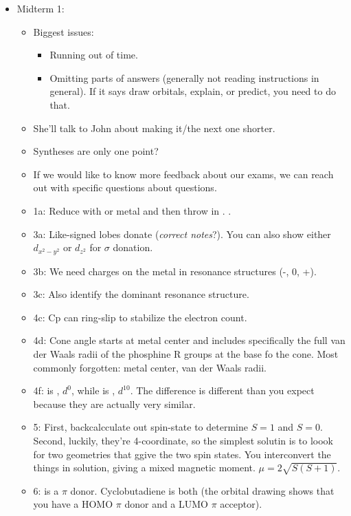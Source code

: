 \documentclass[../notes.tex]{subfiles}
\begin{document}
\begin{itemize}
    \item Midterm 1:
    \begin{itemize}
        \item Biggest issues:
        \begin{itemize}
            \item Running out of time.
            \item Omitting parts of answers (generally not reading instructions in general). If it says draw orbitals, explain, or predict, you need to do that.
        \end{itemize}
        \item She'll talk to John about making it/the next one shorter.
        \item Syntheses are only one point?
        \item If we would like to know more feedback about our exams, we can reach out with specific questions about questions.
        \item 1a: Reduce with  or  metal and then throw in . .
        \item 3a: Like-signed lobes donate (\emph{correct notes}?). You can also show either $d_{x^2-y^2}$ or $d_{z^2}$ for $\sigma$ donation.
        \item 3b: We need charges on the metal in  resonance structures (-, 0, +).
        \item 3c: Also identify the dominant resonance structure.
        \item 4c: Cp can ring-slip to stabilize the electron count.
        \item 4d: Cone angle starts at metal center and includes specifically the full van der Waals radii of the phosphine R groups at the base fo the cone. Most commonly forgotten: metal center, van der Waals radii.
        \item 4f:  is , $d^0$, while  is , $d^{10}$. The difference is different than you expect because they are actually very similar.
        \item 5: First, backcalcculate out spin-state to determine $S=1$ and $S=0$. Second, luckily, they're 4-coordinate, so the simplest solutin is to loook for two geometries that ggive the two spin states. You interconvert the things in solution, giving a mixed magnetic moment. $\mu=2\sqrt{S(S+1)}$.
        \item 6:  is a $\pi$ donor. Cyclobutadiene is both (the orbital drawing shows that you have a HOMO $\pi$ donor and a LUMO $\pi$ acceptor).

\end{itemize}
\end{itemize}
\end{document}
